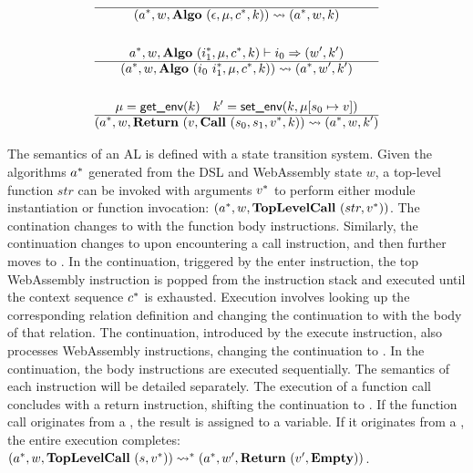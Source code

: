 \begin{gather*}
  \hline
  (\seq{a}, w, \algo ~ (\epsilon, \mu, \seq c, k)) \leadsto (\seq{a}, w, k) \\
%
\newline \\
  \seq{a}, w, \algo ~ (\seq{i_1}, \mu, \seq c, k) \vdash i_0 \Rightarrow (w', k') \\
  \hline
  (\seq{a}, w, \algo ~ (i_0 ~ \seq{i_1}, \mu, \seq c, k)) \leadsto (\seq{a}, w', k') \\
%
\newline \\
  \mu = \getenv(k) \quad k' = \setenv(k, \mu[s_0 \mapsto v]) \\
  \hline
  (\seq{a}, w, \ret ~ (v, \call ~ (s_0, s_1, \seq v, k)) \leadsto (\seq a, w, k') \\
\end{gather*}

The semantics of an AL is defined with a state transition system.
Given the algorithms $a^*$ generated from the DSL and WebAssembly state $w$,
a top-level function $str$ can be invoked with arguments $v^*$ to perform
either module instantiation or function invocation:
$(a^*, w, \textbf{TopLevelCall} ~ (str, v^*))$.
The contination changes to \algo{} with the function body instructions.
Similarly, the continuation changes to \call{} upon encountering a call
instruction, and then further moves to \algo{}.
In the \wasm{} continuation, triggered by the enter instruction, the top
WebAssembly instruction is popped from the instruction stack and executed
until the context sequence $c^*$ is exhausted.
Execution involves looking up the corresponding relation definition and
changing the continuation to \algo{} with the body of that relation.
The \execute{} continuation, introduced by the execute instruction, also
processes WebAssembly instructions, changing the continuation to \algo{}.
In the \algo{} continuation, the body instructions are executed sequentially.
The semantics of each instruction will be detailed separately.
The execution of a function call concludes with a return instruction, shifting
the continuation to \ret{}.
If the function call originates from a \call{}, the result is assigned to a
variable.
If it originates from a \toplevelcall{}, the entire execution completes:
$
(a^*, w, \textbf{TopLevelCall} ~ (s, v^*))
\leadsto^*
(a^*, w', \textbf{Return} ~ (v', \textbf{Empty}))
$.





